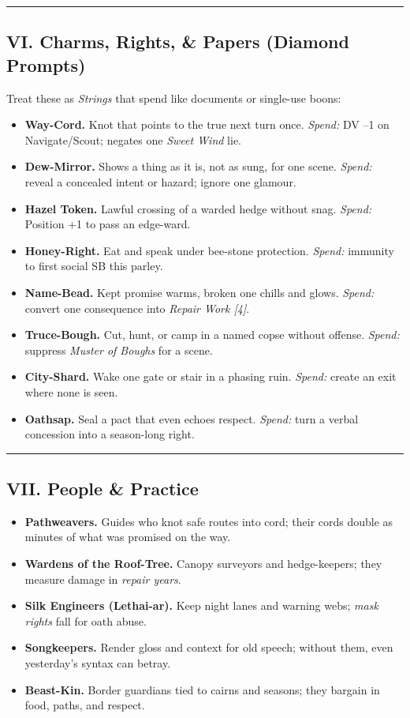 \documentclass[11pt]{article}
\begin{document}
\medskip\hrule\medskip

\subsection{VI. Charms, Rights, \& Papers (Diamond Prompts)}
Treat these as \emph{Strings} that spend like documents or single-use boons:
\begin{itemize}[leftmargin=*]
  \item \textbf{Way-Cord.} Knot that points to the true next turn once. \emph{Spend:} DV --1 on Navigate/Scout; negates one \emph{Sweet Wind} lie.
  \item \textbf{Dew-Mirror.} Shows a thing as it is, not as sung, for one scene. \emph{Spend:} reveal a concealed intent or hazard; ignore one glamour.
  \item \textbf{Hazel Token.} Lawful crossing of a warded hedge without snag. \emph{Spend:} Position +1 to pass an edge-ward.
  \item \textbf{Honey-Right.} Eat and speak under bee-stone protection. \emph{Spend:} immunity to first social SB this parley.
  \item \textbf{Name-Bead.} Kept promise warms, broken one chills and glows. \emph{Spend:} convert one consequence into \emph{Repair Work [4]}.
  \item \textbf{Truce-Bough.} Cut, hunt, or camp in a named copse without offense. \emph{Spend:} suppress \emph{Muster of Boughs} for a scene.
  \item \textbf{City-Shard.} Wake one gate or stair in a phasing ruin. \emph{Spend:} create an exit where none is seen.
  \item \textbf{Oathsap.} Seal a pact that even echoes respect. \emph{Spend:} turn a verbal concession into a season-long right.
\end{itemize}

\medskip\hrule\medskip

\subsection{VII. People \& Practice}
\begin{itemize}[leftmargin=*]
  \item \textbf{Pathweavers.} Guides who knot safe routes into cord; their cords double as minutes of what was promised on the way.
  \item \textbf{Wardens of the Roof-Tree.} Canopy surveyors and hedge-keepers; they measure damage in \emph{repair years}.
  \item \textbf{Silk Engineers (Lethai-ar).} Keep night lanes and warning webs; \emph{mask rights} fall for oath abuse.
  \item \textbf{Songkeepers.} Render gloss and context for old speech; without them, even yesterday's syntax can betray.
  \item \textbf{Beast-Kin.} Border guardians tied to cairns and seasons; they bargain in food, paths, and respect.
\end{itemize}
\end{document}
